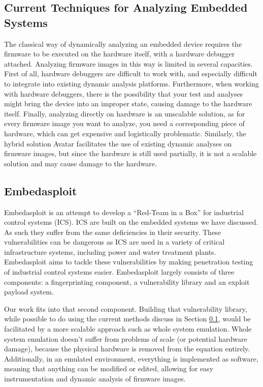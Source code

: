 \documentclass[letterpaper, 10 pt, conference]{ieeeconf}
\begin{document}
\subsection{Current Techniques for Analyzing Embedded Systems} \label{current}
The classical way of dynamically analyzing an embedded device requires the firmware to be executed on the hardware itself, with a hardware debugger attached. Analyzing firmware images in this way is limited in several capacities. First of all, hardware debuggers are difficult to work with, and especially difficult to integrate into existing dynamic analysis platforms. Furthermore, when working with hardware debuggers, there is the possibility that your test and analyses might bring the device into an improper state, causing damage to the hardware itself. Finally, analyzing directly on hardware is an unscalable solution, as for every firmware image you want to analyze, you need a corresponding piece of hardware, which can get expensive and logistically problematic. Similarly, the hybrid solution Avatar \cite{avatar} facilitates the use of existing dynamic analyses on firmware images, but since the hardware is still used partially, it is not a scalable solution and may cause damage to the hardware.

\subsection{Embedasploit} \label{embed}
Embedasploit is an attempt to develop a ``Red-Team in a Box'' for industrial control systems (ICS). ICS are built on the embedded systems we have discussed. As such they suffer from the same deficiencies in their security. These vulnerabilities can be dangerous as ICS are used in a variety of critical infrastructure systems, including power and water treatment plants. Embedasploit aims to tackle these vulnerabilities by making penetration testing of industrial control systems easier. Embedasploit largely consists of three components: a fingerprinting component, a vulnerability library and an exploit payload system. 

Our work fits into that second component. Building that vulnerability library, while possible to do using the current methods discuss in Section \ref{current}, would be facilitated by a more scalable approach such as whole system emulation. Whole system emulation doesn't suffer from problems of scale (or potential hardware damage), because the physical hardware is removed from the equation entirely. Additionally, in an emulated environment, everything is implemented as software, meaning that anything can be modified or edited, allowing for easy instrumentation and dynamic analysis of firmware images. 
\end{document}
